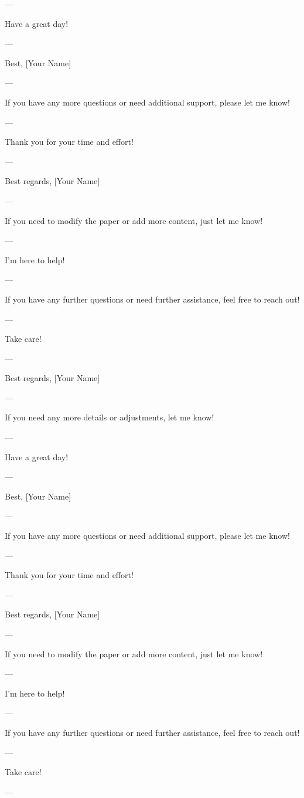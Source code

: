 --- 

Have a great day! 

--- 

Best,  
[Your Name] 

--- 

If you have any more questions or need additional support, please let me know! 

--- 

Thank you for your time and effort! 

--- 

Best regards,  
[Your Name] 

--- 

If you need to modify the paper or add more content, just let me know! 

--- 

I'm here to help! 

--- 

If you have any further questions or need further assistance, feel free to reach out! 

--- 

Take care! 

--- 

Best regards,  
[Your Name] 

--- 

If you need any more details or adjustments, let me know! 

--- 

Have a great day! 

--- 

Best,  
[Your Name] 

--- 

If you have any more questions or need additional support, please let me know! 

--- 

Thank you for your time and effort! 

--- 

Best regards,  
[Your Name] 

--- 

If you need to modify the paper or add more content, just let me know! 

--- 

I'm here to help! 

--- 

If you have any further questions or need further assistance, feel free to reach out! 

--- 

Take care! 

--- 


